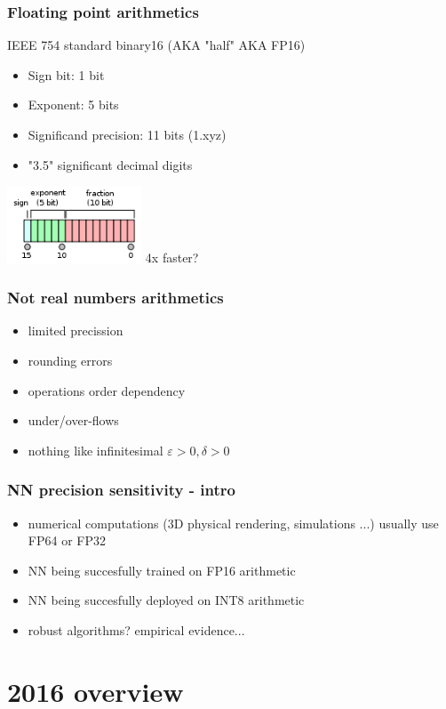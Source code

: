 \documentclass{beamer}
\begin{document}
			\begin{frame}
				\frametitle{Floating point arithmetics}
				IEEE 754 standard binary16 (AKA "half" AKA FP16)
				\begin{itemize} 
					\item Sign bit: 1 bit
					\item Exponent: 5 bits
					\item Significand precision: 11 bits (1.xyz)
					\item "3.5" significant decimal digits
				\end{itemize}
				\includegraphics[width=0.3\textwidth]{Half_Floating_Point_Format.png}
				\vspace{\baselineskip}
				4x faster?
			\end{frame}

			\begin{frame}
				\frametitle{Not real numbers arithmetics}
				\begin{itemize} 
					\item limited precission
					\item rounding errors
					\item operations order dependency
					\item under/over-flows
					\item nothing like infinitesimal $\varepsilon > 0, \delta > 0$
				\end{itemize}
			\end{frame}

			\begin{frame}
				\frametitle{NN precision sensitivity - intro}
				\begin{itemize} 
					\item numerical computations (3D physical rendering, simulations ...) usually use FP64 or FP32
					\item NN being succesfully trained on FP16 arithmetic
					\item NN being succesfully deployed on INT8 arithmetic
					\item robust algorithms? empirical evidence...
				\end{itemize}
			\end{frame}
					
	\section{2016 overview}
		
\end{document}
